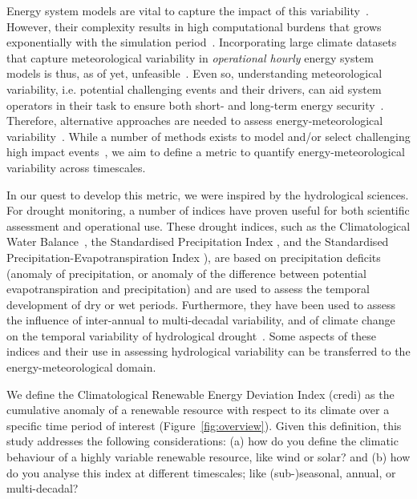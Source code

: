 \documentclass[12pt]{iopart}
\newcommand{\credi}[0]{{\sc credi}}
\begin{document}
Energy system models are vital to capture the impact of this variability~\parencite{gernaat2021climate}. 
However, their complexity results in high computational burdens that grows exponentially with the simulation period~\parencite{wuijts2022modelchar,Price2022,craig2022disconnect,wuijts2023linking,Grochowicz2023}. 
Incorporating large climate datasets that capture meteorological variability in \emph{operational hourly} energy system models is thus, as of yet, unfeasible~\parencite{Harang2020,craig2022disconnect,wuijts2023linking}. 
Even so, understanding meteorological variability, i.e. potential challenging events and their drivers, can aid  system operators in their task to ensure both short- and long-term energy security~\parencite{craig2022disconnect,wuijts2023linking,Hu2023}. 
Therefore, alternative approaches are needed to assess energy-meteorological variability~\parencite{craig2022disconnect,Dubus2022PECD}. 
While a number of methods exists to model and/or select challenging high impact events~\parencite[e.g.][]{vanderwiel2019extreme,Ohlendorf2020,OteroFelipe2021,stoop2021detection,vanderMost2022,Boston2022,Hu2023}, we aim to define a metric to quantify energy-meteorological variability across timescales.

In our quest to develop this metric, we were inspired by the hydrological sciences. 
For drought monitoring, a number of indices have proven useful for both scientific assessment and operational use. 
These drought indices, such as the Climatological Water Balance~\parencite[CWB;][]{gleick1985regional,Gleick1986}, the Standardised Precipitation Index \parencite[SPI;][]{mckee1993}, and the Standardised Precipitation-Evapotranspiration Index \parencite[SPEI;][]{VicenteSerrano2010}), are based on precipitation deficits (anomaly of precipitation, or anomaly of the difference between potential evapotranspiration and precipitation) and are used to assess the temporal development of dry or wet periods. 
Furthermore, they have been used to assess the influence of inter-annual to multi-decadal variability, and of climate change on the temporal variability of hydrological drought~\parencite[e.g.][]{Quiring2009,Stagge2015,Cammalleri2021,vanderWiel2022}. 
Some aspects of these indices and their use in assessing hydrological variability can be transferred to the energy-meteorological domain.

We define the Climatological Renewable Energy Deviation Index (\credi) as the cumulative anomaly of a renewable resource with respect to its climate over a specific time period of interest (Figure~\ref{fig:overview}). 
Given this definition, this study addresses the following considerations: (a) how do you define the climatic behaviour of a highly variable renewable resource, like wind or solar? and (b) how do you analyse this index at different timescales; like (sub-)seasonal, annual, or multi-decadal?
\end{document}
